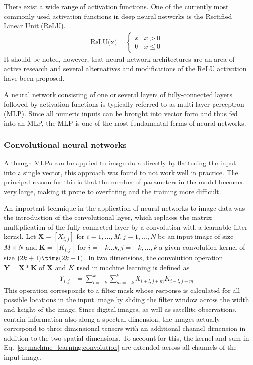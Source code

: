   There exist a wide range of activation functions. One of the currently most
  commonly used activation functions in deep neural networks is the Rectified
  Linear Unit (ReLU).
  \begin{align}
    \text{ReLU(x)} = \begin{cases}
      x & x > 0 \\
      0 & x \leq 0
    \end{cases}
  \end{align}
  It should be noted, however, that neural network architectures are an area of
  active research and several alternatives and modifications of the ReLU
  activation have been proposed.

  A neural network consisting of one or several layers of fully-connected
  layers followed by activation functions is typically referred to as
  multi-layer perceptron (MLP). Since all numeric inputs can be brought into
  vector form and thus fed into an MLP, the MLP is one of the most fundamental
  forms of neural networks.

\subsubsection{Convolutional neural networks}

Although MLPs can be applied to image data directly by flattening the input into
a single vector, this approach was found to not work well in practice. The
principal reason for this is that the number of parameters in the model becomes
very large, making it prone to overfitting and the training more
difficult.

An important technique in the application of neural networks to image data was
the introduction of the convolutional layer, which replaces the
matrix multiplication of the fully-connected layer by a convolution with a
learnable filter kernel. Let $\bm{X} = [X_{i, j}]$ for $i = 1, \dots, M, j = 1,
\ldots, N$ be an input image of size $M \times N$ and $\bm{K} = [K_{i, j}]$ for
$i = - k \ldots k, j = -k, \ldots, k$ a given convolution kernel of 
size $(2k + 1) \tims (2k + 1)$. In two dimensions, the convolution
operation $\bm{Y} = \bm{X} * \bm{K}$ of
$\bm{X}$ and $K$ used in machine learning is defined as
\begin{align}\label{eq:machine_learning:convolution}
  Y_{i, j} &= \sum_{l=-k}^{k} \sum_{m=-k}^{k} X_{i + l, j + m} K_{i + l, j + m}
\end{align}
This operation corresponds to a filter mask whose response is calculated for all
possible locations in the input image by sliding the filter window across the
width and height of the image. Since digital images, as well as satellite
observations, contain information also along a spectral dimension, the images
actually correspond to three-dimensional tensors with an additional channel
dimension in addition to the two spatial dimensions. To account for this, the
kernel and sum in Eq.~\ref{eq:machine_learning:convolution} are extended across
all channels of the input image.

